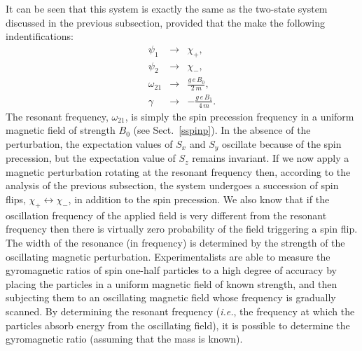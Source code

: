 It can be seen that this system is exactly the same as the two-state
system discussed in the previous subsection, provided that the
make the following indentifications:
\begin{eqnarray}
\psi_1 &\rightarrow&\chi_+,\\[0.5ex]
\psi_2&\rightarrow&\chi_-,\\[0.5ex]
\omega_{21}  &\rightarrow& \frac{g\,e\,B_0}{2\,m},\\[0.5ex]
\gamma&\rightarrow& -\frac{g\,e\,B_1}{4\,m}.
\end{eqnarray}
The resonant frequency, $\omega_{21}$, is simply the spin precession
frequency in a uniform magnetic field of strength $B_0$ (see Sect.~\ref{sspinp}). In the absence of the perturbation, the
expectation values of $S_x$ and $S_y$ oscillate because of the spin
precession, but the expectation value of $S_z$ remains invariant. If we
now apply a magnetic perturbation rotating at the resonant frequency then,
according to the analysis of the previous subsection, the system undergoes
a succession of spin flips, $\chi_+\leftrightarrow\chi_-$, in addition
to the spin precession. We also know that if the oscillation frequency
of the applied field is very different from the resonant frequency
then there is virtually zero probability of the field triggering a
spin flip. The width of the resonance (in frequency) is determined by
the strength of the oscillating magnetic perturbation. Experimentalists
are able to measure the gyromagnetic ratios of spin one-half
particles to a high degree of accuracy by placing the particles
in a uniform magnetic field of known strength, and then subjecting them to an oscillating
magnetic field whose frequency is gradually scanned. By determining the
resonant frequency ({\em i.e.}, the frequency at which the particles
absorb energy from the oscillating field), it is possible
to determine the gyromagnetic ratio (assuming that the mass is known).

